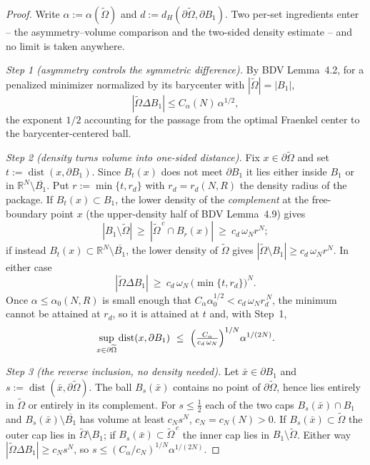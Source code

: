 \documentclass[11pt]{article}
\theoremstyle{definition}
\newcommand{\R}{\mathbb{R}}
\newcommand{\abs}[1]{\left|#1\right|}
\begin{document}
\begin{proof}
Write $\alpha:=\alpha(\widetilde\Omega)$ and
$d:=d_H(\partial\widetilde\Omega,\partial B_1)$. Two per-set ingredients enter
-- the asymmetry--volume comparison and the two-sided density estimate --
and no limit is taken anywhere.

\emph{Step 1 (asymmetry controls the symmetric difference).} By BDV Lemma~4.2,
for a penalized minimizer normalized by its barycenter with
$\abs{\widetilde\Omega}=\abs{B_1}$,
\[
\abs{\widetilde\Omega\Delta B_1}\le C_\alpha(N)\,\alpha^{1/2},
\]
the exponent $1/2$ accounting for the passage from the optimal Fraenkel
center to the barycenter-centered ball.

\emph{Step 2 (density turns volume into one-sided distance).} Fix
$x\in\partial\widetilde\Omega$ and set $t:=\operatorname{dist}(x,\partial B_1)$.
Since $B_t(x)$ does not meet $\partial B_1$ it lies either inside $B_1$ or in
$\R^N\setminus\overline{B_1}$. Put $r:=\min\{t,r_d\}$ with $r_d=r_d(N,R)$ the
density radius of the package. If $B_t(x)\subset B_1$, the lower density of the
\emph{complement} at the free-boundary point $x$ (the upper-density half of
BDV Lemma~4.9) gives
\[
\abs{B_1\setminus\widetilde\Omega}
\ \ge\ \abs{\widetilde\Omega^{\,c}\cap B_r(x)}
\ \ge\ c_d\,\omega_N r^{N};
\]
if instead $B_t(x)\subset\R^N\setminus\overline{B_1}$, the lower density of
$\widetilde\Omega$ gives $\abs{\widetilde\Omega\setminus B_1}\ge
c_d\,\omega_N r^{N}$. In either case
\[
\abs{\widetilde\Omega\Delta B_1}\ \ge\ c_d\,\omega_N\,
\bigl(\min\{t,r_d\}\bigr)^{N}.
\]
Once $\alpha\le\alpha_0(N,R)$ is small enough that
$C_\alpha\alpha_0^{1/2}<c_d\,\omega_N r_d^{\,N}$, the minimum cannot be
attained at $r_d$, so it is attained at $t$ and, with Step~1,
\[
\sup_{x\in\partial\widetilde\Omega}\operatorname{dist}(x,\partial B_1)
\ \le\ \Bigl(\tfrac{C_\alpha}{c_d\,\omega_N}\Bigr)^{1/N}\alpha^{1/(2N)} .
\]

\emph{Step 3 (the reverse inclusion, no density needed).} Let
$\bar x\in\partial B_1$ and $s:=\operatorname{dist}(\bar x,\partial\widetilde
\Omega)$. The ball $B_s(\bar x)$ contains no point of
$\partial\widetilde\Omega$, hence lies entirely in $\widetilde\Omega$ or
entirely in its complement. For $s\le\tfrac12$ each of the two caps
$B_s(\bar x)\cap B_1$ and $B_s(\bar x)\setminus\overline{B_1}$ has volume at
least $c_N s^{N}$, $c_N=c_N(N)>0$. If $B_s(\bar x)\subset\widetilde\Omega$ the
outer cap lies in $\widetilde\Omega\setminus B_1$; if
$B_s(\bar x)\subset\widetilde\Omega^{\,c}$ the inner cap lies in
$B_1\setminus\widetilde\Omega$. Either way $\abs{\widetilde\Omega\Delta
B_1}\ge c_N s^{N}$, so $s\le(C_\alpha/c_N)^{1/N}\alpha^{1/(2N)}$.


\end{proof}
\end{document}
